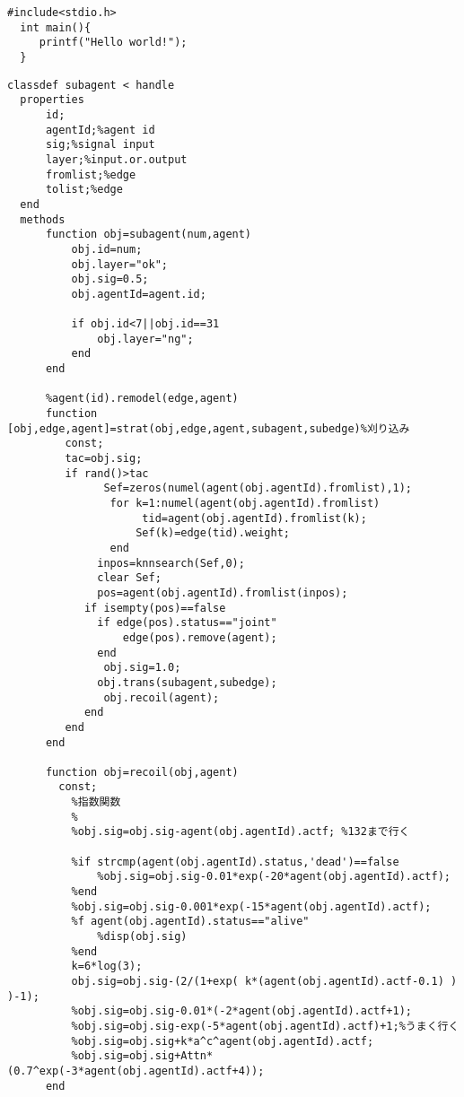 \begin{lstlisting}[caption=edge.m]
  #include<stdio.h>
  int main(){
     printf("Hello world!");
  }
\end{lstlisting}
\begin{lstlisting}[caption=subagent.m]
  classdef subagent < handle
  properties
      id;
      agentId;%agent id
      sig;%signal input 
      layer;%input.or.output
      fromlist;%edge
      tolist;%edge
  end
  methods
      function obj=subagent(num,agent)
          obj.id=num;
          obj.layer="ok";
          obj.sig=0.5;
          obj.agentId=agent.id;

          if obj.id<7||obj.id==31
              obj.layer="ng";
          end
      end
     
      %agent(id).remodel(edge,agent)
      function [obj,edge,agent]=strat(obj,edge,agent,subagent,subedge)%刈り込み
         const;
         tac=obj.sig;
         if rand()>tac
               Sef=zeros(numel(agent(obj.agentId).fromlist),1);
                for k=1:numel(agent(obj.agentId).fromlist)
                     tid=agent(obj.agentId).fromlist(k);
                    Sef(k)=edge(tid).weight;
                end
              inpos=knnsearch(Sef,0);
              clear Sef;
              pos=agent(obj.agentId).fromlist(inpos);
            if isempty(pos)==false
              if edge(pos).status=="joint"
                  edge(pos).remove(agent);
              end
               obj.sig=1.0;
              obj.trans(subagent,subedge);
               obj.recoil(agent);
            end
         end
      end
    
      function obj=recoil(obj,agent)
        const;
          %指数関数
          %
          %obj.sig=obj.sig-agent(obj.agentId).actf; %132まで行く
        
          %if strcmp(agent(obj.agentId).status,'dead')==false
              %obj.sig=obj.sig-0.01*exp(-20*agent(obj.agentId).actf);
          %end
          %obj.sig=obj.sig-0.001*exp(-15*agent(obj.agentId).actf);
          %f agent(obj.agentId).status=="alive"
              %disp(obj.sig)
          %end
          k=6*log(3);
          obj.sig=obj.sig-(2/(1+exp( k*(agent(obj.agentId).actf-0.1) ) )-1);
          %obj.sig=obj.sig-0.01*(-2*agent(obj.agentId).actf+1);
          %obj.sig=obj.sig-exp(-5*agent(obj.agentId).actf)+1;%うまく行く
          %obj.sig=obj.sig+k*a^c^agent(obj.agentId).actf;
          %obj.sig=obj.sig+Attn*(0.7^exp(-3*agent(obj.agentId).actf+4));
      end


\end{lstlisting}
